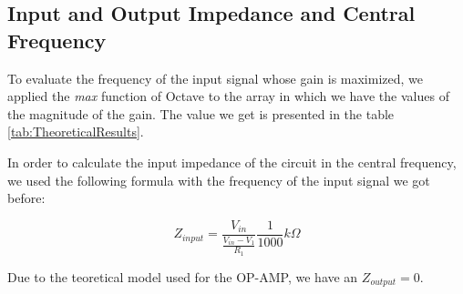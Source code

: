 \subsection{Input and Output Impedance and Central Frequency}

To evaluate the frequency of the input signal whose gain is maximized, we applied the \textit{max} function of Octave to the array in which
we have the values of the magnitude of the gain. The value we get is presented in the table \ref*{tab:TheoreticalResults}.

In order to calculate the input impedance of the circuit in the central frequency,
we used the following formula with the frequency of the input signal we got before:

\begin{equation}
  Z_{input} = \frac{V_{in}}{\frac{V_{in} - V_1}{R_1}} \frac{1}{1000} k \Omega
\end{equation}

Due to the teoretical model used for the OP-AMP, we have an $Z_{output} = 0$.

